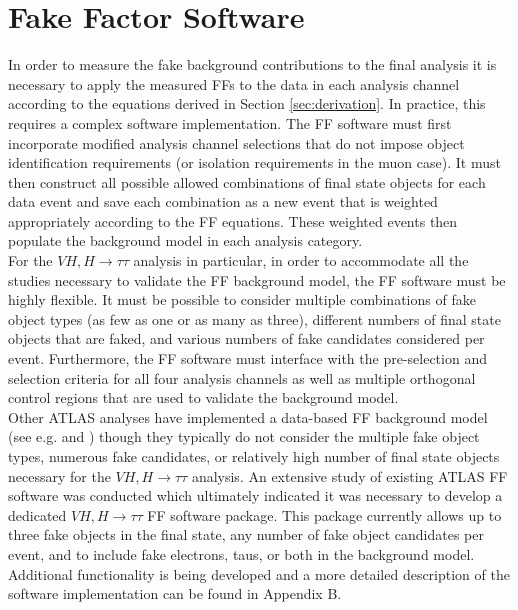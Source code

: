 \section{Fake Factor Software}
In order to measure the fake background contributions to the final analysis it is necessary to apply the measured FFs to the data in each analysis channel according to the equations derived in Section \ref{sec:derivation}. In practice, this requires a complex software implementation. The FF software must first incorporate modified analysis channel selections that do not impose object identification requirements (or isolation requirements in the muon case). It must then construct all possible allowed combinations of final state objects for each data event and save each combination as a new event that is weighted appropriately according to the FF equations. These weighted events then populate the background model in each analysis category.\\

For the $VH,H\rightarrow\tau\tau$ analysis in particular, in order to accommodate all the studies necessary to validate the FF background model, the FF software must be highly flexible. It must be possible to consider multiple combinations of fake object types (as few as one or as many as three),  different numbers of final state objects that are faked, and various numbers of fake candidates considered per event. Furthermore, the FF software must interface with the pre-selection and selection criteria for all four analysis channels as well as multiple orthogonal control regions that are used to validate the background model.\\

Other ATLAS analyses have implemented a data-based FF background model (see e.g. \cite{fake_tau_paper} and \cite{run2_htautau}) though they typically do not consider the multiple fake object types, numerous fake candidates, or relatively high number of final state objects necessary for the $VH,H\rightarrow\tau\tau$ analysis. An extensive study of existing ATLAS FF software was conducted which ultimately indicated it was necessary to develop a dedicated $VH,H\rightarrow\tau\tau$ FF software package. This package currently allows up to three fake objects in the final state, any number of fake object candidates per event, and to include fake electrons, taus, or both in the background model. Additional functionality is being developed and a more detailed description of the software implementation can be found in Appendix B.

